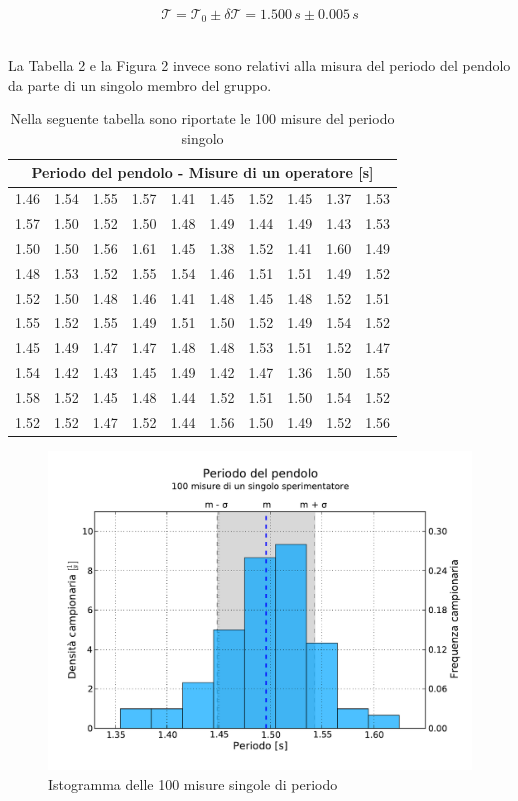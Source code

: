 \documentclass[12pt, twoside, a4paper]{article}
\begin{document}
\begin{equation}
\mathcal{T} = \mathcal{T}_0 \pm \delta\mathcal{T} = 1.500\,s \pm 0.005\,s
\end{equation}\\

\newpage

La Tabella 2 e la Figura 2 invece sono relativi alla misura del periodo del pendolo da parte di un singolo membro del gruppo.

\begin{table}[bht]
	\centering
	\begin{tabular} {c c c c c | c c c c c}
		\toprule
		\multicolumn{10}{c}{Periodo del pendolo - Misure di un operatore [s]} \\
		\midrule
		1.46 & 1.54 & 1.55 & 1.57 & 1.41 & 1.45 & 1.52 & 1.45 & 1.37 & 1.53 \\
		1.57 & 1.50 & 1.52 & 1.50 & 1.48 & 1.49 & 1.44 & 1.49 & 1.43 & 1.53 \\
		1.50 & 1.50 & 1.56 & 1.61 & 1.45 & 1.38 & 1.52 & 1.41 & 1.60 & 1.49 \\
		1.48 & 1.53 & 1.52 & 1.55 & 1.54 & 1.46 & 1.51 & 1.51 & 1.49 & 1.52 \\
		1.52 & 1.50 & 1.48 & 1.46 & 1.41 & 1.48 & 1.45 & 1.48 & 1.52 & 1.51 \\
		\midrule
		1.55 & 1.52 & 1.55 & 1.49 & 1.51 & 1.50 & 1.52 & 1.49 & 1.54 & 1.52 \\
		1.45 & 1.49 & 1.47 & 1.47 & 1.48 & 1.48 & 1.53 & 1.51 & 1.52 & 1.47 \\
		1.54 & 1.42 & 1.43 & 1.45 & 1.49 & 1.42 & 1.47 & 1.36 & 1.50 & 1.55 \\
		1.58 & 1.52 & 1.45 & 1.48 & 1.44 & 1.52 & 1.51 & 1.50 & 1.54 & 1.52 \\
		1.52 & 1.52 & 1.47 & 1.52 & 1.44 & 1.56 & 1.50 & 1.49 & 1.52 & 1.56 \\
	\bottomrule
	\end{tabular}
	\caption{Nella seguente tabella sono riportate le 100 misure del periodo singolo}
\end{table}

\begin{figure}[bht]
	\centering
	\includegraphics[width=130mm]{Pendolo100.pdf}
	\caption{Istogramma delle 100 misure singole di periodo}
\end{figure}
\end{document}
